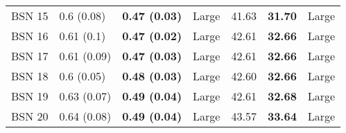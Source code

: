 \begin{tabular}{lllllll}
 BSN 15 &        0.6 (0.08) &  \textbf{0.47 (0.03)} &       Large &                   41.63 &           \textbf{31.70} &       Large \\
 BSN 16 &        0.61 (0.1) &  \textbf{0.47 (0.02)} &       Large &                   42.61 &           \textbf{32.66} &       Large \\
 BSN 17 &       0.61 (0.09) &  \textbf{0.47 (0.03)} &       Large &                   42.61 &           \textbf{32.66} &       Large \\
 BSN 18 &        0.6 (0.05) &  \textbf{0.48 (0.03)} &       Large &                   42.60 &           \textbf{32.66} &       Large \\
 BSN 19 &       0.63 (0.07) &  \textbf{0.49 (0.04)} &       Large &                   42.61 &           \textbf{32.68} &       Large \\
 BSN 20 &       0.64 (0.08) &  \textbf{0.49 (0.04)} &       Large &                   43.57 &           \textbf{33.64} &       Large \\
\bottomrule
\end{tabular}
